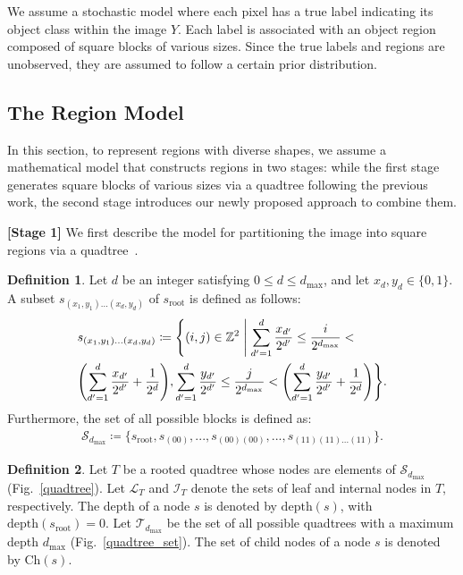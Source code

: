 \documentclass[conference]{IEEEtran}
\theoremstyle{definition}
\newtheorem{defi}{Definition}
\begin{document}
We assume a stochastic model where each pixel has a true label indicating its object class within the image $Y$. 
Each label is associated with an object region composed of square blocks of various sizes. 
Since the true labels and regions are unobserved, they are assumed to follow a certain prior distribution.


\subsection{The Region Model}

In this section, to represent regions with diverse shapes, we assume a mathematical model that constructs regions in two stages: while the first stage generates square blocks of various sizes via a quadtree following the previous work\cite{wang_isita2024}, the second stage introduces our newly proposed approach to combine them.

\textbf{[Stage 1]} We first describe the model for partitioning the image into square regions via a quadtree~\cite{wang_isita2024, nakahara_quadtree}.


\begin{defi}
Let $d$ be an integer satisfying $0 \leq d \leq d_{\mathrm{max}}$, and let $x_d, y_d \in \{0,1\}$. A subset $s_{(x_1,y_1)...(x_d,y_d)}$ of $s_{\text{root}}$ is defined as follows:
\begin{align}
&s_{(x_1,y_1)...(x_d,y_d)}\coloneqq \Biggl\{(i,j)\in\mathbb{Z}^2 \Biggm| \sum_{d'=1}^d \frac{x_{d'}}{2^{d'}}\leq \frac{i}{2^{d_{\mathrm{max}}}}<\nonumber\\
&\Biggl(\sum_{d'=1}^d \frac{x_{d'}}{2^{d'}} + \frac{1}{2^d}\Biggr),\sum_{d'=1}^d \frac{y_{d'}}{2^{d'}}\leq \frac{j}{2^{d_{\mathrm{max}}}}<\left(\sum_{d'=1}^d \frac{y_{d'}}{2^{d'}} + \frac{1}{2^d}\right)\Biggr\}. 
\end{align}
 Furthermore, the set of all possible blocks is defined as:
\begin{eqnarray}
\mathcal{S}_{d_{\mathrm{max}}} \coloneqq \{s_{\text{root}}, s_{(00)}, ..., s_{(00)(00)}, ..., s_{(11)(11)...(11)}\}.
\end{eqnarray}
\end{defi}

\begin{defi}
  Let $T$ be a rooted quadtree whose nodes are elements of $\mathcal{S}_{d_{\mathrm{max}}}$ (Fig.~\ref{quadtree}). 
  Let $\mathcal{L}_T$ and $\mathcal{I}_T$ denote the sets of leaf and internal nodes in $T$, respectively. 
  The depth of a node $s$ is denoted by $\mathrm{depth}(s)$, with $\mathrm{depth}(s_{\text{root}})=0$. 
  Let $\mathcal{T}_{d_{\text{max}}}$ be the set of all possible quadtrees with a maximum depth $d_{\text{max}}$ (Fig.~\ref{quadtree_set}). 
  The set of child nodes of a node $s$ is denoted by $\mathrm{Ch}(s)$.
\end{defi}
\end{document}
